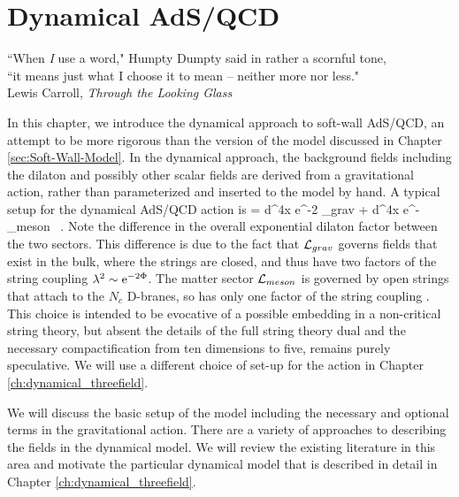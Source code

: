 \chapter{Dynamical AdS/QCD}
\label{ch:dynamical}

\begin{flushright}
``When \emph{I} use a word," Humpty Dumpty said in rather a scornful tone,\\
 ``it means just what I choose it to mean -- neither more nor less." \\
Lewis Carroll, \emph{Through the Looking Glass}
\end{flushright}

In this chapter, we introduce the dynamical approach to soft-wall AdS/QCD, an attempt to be more rigorous than the version of the model discussed in Chapter \ref{sec:Soft-Wall-Model}.
In the dynamical approach, the background fields including the dilaton and possibly other scalar fields are derived from a gravitational action, rather than parameterized and inserted to the model by hand.
A typical setup for the dynamical AdS/QCD action is 
\be
{} = \int d^4x \root e^{-2\Phi} _{grav} + \int d^4x \root e^{-\Phi} _{meson} \, .
\ee 
Note the difference in the overall exponential dilaton factor between the two sectors.
This difference is due to the fact that $\mathcal L_{grav}$ governs fields that exist in the bulk, where the strings are closed, and thus have two factors of the string coupling $\lambda^2 \sim \mathrm{e}^{-2\Phi}$. 
The matter sector $\mathcal L_{meson}$ is governed by open strings that attach to the $N_c$ D-branes, so has only one factor of the string coupling \cite{stringnutshell}. 
This choice is intended to be evocative of a possible embedding in a non-critical string theory, but absent the details of the full string theory dual and the necessary compactification from ten dimensions to five, remains purely speculative.
We will use a different choice of set-up for the action in Chapter \ref{ch:dynamical_threefield}.

We will discuss the basic setup of the model including the necessary and optional terms in the gravitational action.
There are a variety of approaches to describing the fields in the dynamical model.
We will review the existing literature in this area and motivate the particular dynamical model that is described in detail in Chapter \ref{ch:dynamical_threefield}.

